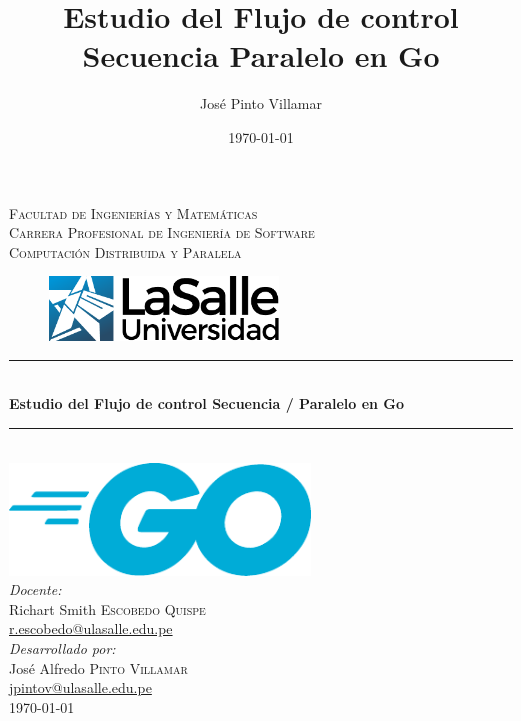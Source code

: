 \documentclass[a4paper]{article}
\title{Estudio del Flujo de control Secuencia Paralelo en Go}					                                %
\author{José Pinto Villamar}				                                                                              	%
\date{\today}					                                                                        	%
\newcommand{\HRule}{\rule{\linewidth}{0.5mm}}
\begin{document}
\graphicspath{{./images/}}

%

\begin{titlepage}
    \centering
    
    \textsc{\Large Facultad de Ingenierías y Matemáticas}\\[0.2cm]
    \textsc{\Large Carrera Profesional de Ingeniería de Software}\\[0.2cm]
    \textsc{\Large Computación Distribuida y Paralela}\\[0.5cm]
    
    \centering
        \vspace*{0.0 cm}
        \begin{figure}
            \centering
            \hspace{1cm}
            \includegraphics[height = 65px]{logo-la-salle.pdf}
        \end{figure}
    
    \HRule{} \\[0.5cm]
    { \LARGE \bfseries Estudio del Flujo de control Secuencia / Paralelo en Go}\\[0.3cm]
    \HRule{} \\[0.5cm]
    
    \includegraphics[width = 0.6\textwidth]{Go_Logo_Blue.pdf}\\[0.5cm]

    \Large \emph{Docente:}\\
    Richart Smith \textsc{Escobedo Quispe}\\
    \href{mailto:r.escobedo@ulasalle.edu.pe}{r.escobedo@ulasalle.edu.pe}\\[0.5cm]
    
    \Large \emph{Desarrollado por:}\\
    José Alfredo \textsc{Pinto Villamar}\\
    \href{mailto:jpintov@ulasalle.edu.pe}{jpintov@ulasalle.edu.pe}\\[0.5cm]
    
    {\large \today}\\[2cm]
    
    \end{titlepage}
\end{document}
